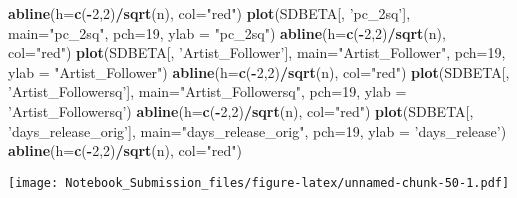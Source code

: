 \documentclass[
]{article}
\newenvironment{Shaded}{\begin{snugshade}}{\end{snugshade}}
\newcommand{\DataTypeTok}[1]{\textcolor[rgb]{0.13,0.29,0.53}{#1}}
\newcommand{\DecValTok}[1]{\textcolor[rgb]{0.00,0.00,0.81}{#1}}
\newcommand{\KeywordTok}[1]{\textcolor[rgb]{0.13,0.29,0.53}{\textbf{#1}}}
\newcommand{\NormalTok}[1]{#1}
\newcommand{\OperatorTok}[1]{\textcolor[rgb]{0.81,0.36,0.00}{\textbf{#1}}}
\newcommand{\StringTok}[1]{\textcolor[rgb]{0.31,0.60,0.02}{#1}}
\begin{document}
\begin{Shaded}
\begin{Highlighting}[]
\KeywordTok{abline}\NormalTok{(}\DataTypeTok{h=}\KeywordTok{c}\NormalTok{(}\OperatorTok{-}\DecValTok{2}\NormalTok{,}\DecValTok{2}\NormalTok{)}\OperatorTok{/}\KeywordTok{sqrt}\NormalTok{(n), }\DataTypeTok{col=}\StringTok{"red"}\NormalTok{)}
\KeywordTok{plot}\NormalTok{(SDBETA[, }\StringTok{'pc_2sq'}\NormalTok{], }\DataTypeTok{main=}\StringTok{"pc_2sq"}\NormalTok{, }\DataTypeTok{pch=}\DecValTok{19}\NormalTok{, }\DataTypeTok{ylab =} \StringTok{"pc_2sq"}\NormalTok{)}
\KeywordTok{abline}\NormalTok{(}\DataTypeTok{h=}\KeywordTok{c}\NormalTok{(}\OperatorTok{-}\DecValTok{2}\NormalTok{,}\DecValTok{2}\NormalTok{)}\OperatorTok{/}\KeywordTok{sqrt}\NormalTok{(n), }\DataTypeTok{col=}\StringTok{"red"}\NormalTok{)}
\KeywordTok{plot}\NormalTok{(SDBETA[, }\StringTok{'Artist_Follower'}\NormalTok{], }\DataTypeTok{main=}\StringTok{"Artist_Follower"}\NormalTok{, }\DataTypeTok{pch=}\DecValTok{19}\NormalTok{, }\DataTypeTok{ylab =} \StringTok{"Artist_Follower"}\NormalTok{)}
\KeywordTok{abline}\NormalTok{(}\DataTypeTok{h=}\KeywordTok{c}\NormalTok{(}\OperatorTok{-}\DecValTok{2}\NormalTok{,}\DecValTok{2}\NormalTok{)}\OperatorTok{/}\KeywordTok{sqrt}\NormalTok{(n), }\DataTypeTok{col=}\StringTok{"red"}\NormalTok{)}
\KeywordTok{plot}\NormalTok{(SDBETA[, }\StringTok{'Artist_Followersq'}\NormalTok{], }\DataTypeTok{main=}\StringTok{"Artist_Followersq"}\NormalTok{, }\DataTypeTok{pch=}\DecValTok{19}\NormalTok{, }\DataTypeTok{ylab =} \StringTok{'Artist_Followersq'}\NormalTok{)}
\KeywordTok{abline}\NormalTok{(}\DataTypeTok{h=}\KeywordTok{c}\NormalTok{(}\OperatorTok{-}\DecValTok{2}\NormalTok{,}\DecValTok{2}\NormalTok{)}\OperatorTok{/}\KeywordTok{sqrt}\NormalTok{(n), }\DataTypeTok{col=}\StringTok{"red"}\NormalTok{)}
\KeywordTok{plot}\NormalTok{(SDBETA[, }\StringTok{'days_release_orig'}\NormalTok{], }\DataTypeTok{main=}\StringTok{"days_release_orig"}\NormalTok{, }\DataTypeTok{pch=}\DecValTok{19}\NormalTok{, }\DataTypeTok{ylab =} \StringTok{'days_release'}\NormalTok{)}
\KeywordTok{abline}\NormalTok{(}\DataTypeTok{h=}\KeywordTok{c}\NormalTok{(}\OperatorTok{-}\DecValTok{2}\NormalTok{,}\DecValTok{2}\NormalTok{)}\OperatorTok{/}\KeywordTok{sqrt}\NormalTok{(n), }\DataTypeTok{col=}\StringTok{"red"}\NormalTok{)}
\end{Highlighting}
\end{Shaded}

\texttt{[image: Notebook\_Submission\_files/figure-latex/unnamed-chunk-50-1.pdf]}
\end{document}
